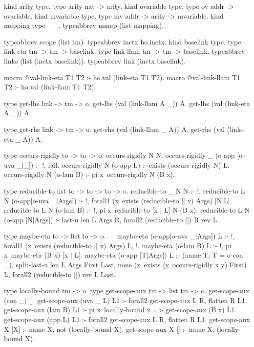 \begin{elpicode}
  kind arity type.
  type arity nat -> arity.
  kind ovariable type.
  type ov addr -> ovariable.
  kind mvariable type.
  type mv addr -> arity -> mvariable.
  kind mapping type.
  ~  ~.
  typeabbrev mmap (list mapping).

  typeabbrev scope (list tm).
  typeabbrev inctx ho.inctx.
  kind baselink type.
  type link-eta  tm -> tm -> baselink.
  type link-llam tm -> tm -> baselink.
  typeabbrev links (list (inctx baselink)).
  typeabbrev link (inctx baselink).

  macro @val-link-eta T1 T2 :- ho.val (link-eta T1 T2).
  macro @val-link-llam T1 T2 :- ho.val (link-llam T1 T2).


  type get-lhs link -> tm -> o.
  get-lhs (val (link-llam A _)) A.
  get-lhs (val (link-eta A _)) A.

  type get-rhs link -> tm -> o.
  get-rhs (val (link-llam _ A)) A.
  get-rhs (val (link-eta _ A)) A.


  type occurs-rigidly to -> to -> o.
  occurs-rigidly N N.
  occurs-rigidly _ (o-app [o-uva _|_]) :- !, fail.
  occurs-rigidly N (o-app L) :- exists (occurs-rigidly N) L.
  occurs-rigidly N (o-lam B) :- pi x\ occurs-rigidly N (B x).

  type reducible-to list to -> to -> to -> o.
  reducible-to _ N N :- !.
  reducible-to L N (o-app[o-uva _|Args]) :- !, 
    forall1 (x\ exists (reducible-to [] x) Args) [N|L]. 
  reducible-to L N (o-lam B) :- !, 
    pi x\ reducible-to [x | L] N (B x).
  reducible-to L N (o-app [N|Args]) :-
    last-n {len L} Args R,
    forall2 (reducible-to []) R {rev L}.

  type maybe-eta to -> list to -> o.                  ~~
  maybe-eta (o-app[o-uva _|Args]) L :- !,
    forall1 (x\ exists (reducible-to [] x) Args) L, !. 
  maybe-eta (o-lam B) L :- !, pi x\ maybe-eta (B x) [x | L].
  maybe-eta (o-app [T|Args]) L :- (name T; T = o-con _),
    split-last-n {len L} Args First Last,
    none (x\ exists (y\ occurs-rigidly x y) First) L,
    forall2 (reducible-to []) {rev L} Last.


  type locally-bound tm -> o.
  type get-scope-aux tm -> list tm -> o.
  get-scope-aux (con _) [].
  get-scope-aux (uva _ L) L1 :- 
    forall2 get-scope-aux L R,
    flatten R L1.
  get-scope-aux (lam B) L1 :- 
    pi x\ locally-bound x => get-scope-aux (B x) L1.
  get-scope-aux (app L) L1 :- 
    forall2 get-scope-aux L R,
    flatten R L1.
  get-scope-aux X [X] :- name X, not (locally-bound X).
  get-scope-aux X [] :- name X, (locally-bound X).


\end{elpicode}
